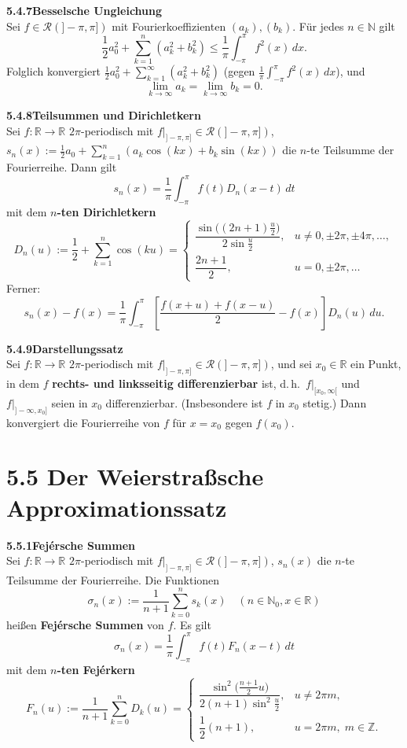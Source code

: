 \documentclass[a4paper,12pt]{article}
\newcommand{\gentry}[3]{%
  \noindent\textbf{#1\quad #2}\nopagebreak\\[0.2em]
  #3\par\smallskip
}
\begin{document}
\gentry{5.4.7}{Besselsche Ungleichung}{%
  Sei $f \in \mathcal{R}(]-\pi,\pi])$ mit Fourierkoeffizienten $(a_k), (b_k)$.
  Für jedes $n \in \mathbb{N}$ gilt
  \[
    \frac{1}{2} a_0^2 + \sum_{k=1}^n (a_k^2 + b_k^2)
    \leq \frac{1}{\pi} \int_{-\pi}^\pi f^2(x)\,dx.
  \]
  Folglich konvergiert $\frac{1}{2} a_0^2 + \sum_{k=1}^\infty (a_k^2 + b_k^2)$
  (gegen $\frac{1}{\pi}\int_{-\pi}^\pi f^2(x)\,dx$), und
  \[
    \lim_{k\to\infty} a_k = \lim_{k\to\infty} b_k = 0.
  \]
}

\gentry{5.4.8}{Teilsummen und Dirichletkern}{%
  Sei $f: \mathbb{R} \to \mathbb{R}$ $2\pi$-periodisch mit
  $f|_{]-\pi,\pi]} \in \mathcal{R}(]-\pi,\pi])$,
  $s_n(x) := \frac{1}{2} a_0 + \sum_{k=1}^n (a_k \cos(kx) + b_k \sin(kx))$ die
  $n$-te Teilsumme der Fourierreihe. Dann gilt
  \[
    s_n(x) = \frac{1}{\pi} \int_{-\pi}^\pi f(t) D_n(x - t)\,dt
  \]
  mit dem \textbf{$n$-ten Dirichletkern}
  \[
    D_n(u) := \frac{1}{2} + \sum_{k=1}^n \cos(ku) =
    \begin{cases}
      \dfrac{\sin\bigl((2n+1)\frac{u}{2}\bigr)}{2 \sin\frac{u}{2}}, & u \neq 0, \pm 2\pi, \pm 4\pi, \ldots,\\[0.5em]
      \dfrac{2n+1}{2}, & u = 0, \pm 2\pi, \ldots
    \end{cases}
  \]
  Ferner:
  \[
    s_n(x) - f(x) = \frac{1}{\pi} \int_{-\pi}^\pi \left[\frac{f(x+u) + f(x-u)}{2} - f(x)\right] D_n(u)\,du.
  \]
}

\gentry{5.4.9}{Darstellungssatz}{%
  Sei $f: \mathbb{R} \to \mathbb{R}$ $2\pi$-periodisch mit
  $f|_{]-\pi,\pi]} \in \mathcal{R}(]-\pi,\pi])$, und sei $x_0 \in \mathbb{R}$ ein
  Punkt, in dem $f$ \textbf{rechts- und linksseitig differenzierbar} ist, d.\,h.\
  $f|_{[x_0, \infty[}$ und $f|_{]-\infty, x_0]}$ seien in $x_0$ differenzierbar.
  (Insbesondere ist $f$ in $x_0$ stetig.) Dann konvergiert die Fourierreihe von
  $f$ für $x = x_0$ gegen $f(x_0)$.
}

\section*{5.5 \quad Der Weierstraßsche Approximationssatz}

\gentry{5.5.1}{Fejérsche Summen}{%
  Sei $f: \mathbb{R} \to \mathbb{R}$ $2\pi$-periodisch mit $f|_{]-\pi,\pi]} \in \mathcal{R}(]-\pi,\pi])$,
  $s_n(x)$ die $n$-te Teilsumme der Fourierreihe. Die Funktionen
  \[
    \sigma_n(x) := \frac{1}{n+1} \sum_{k=0}^n s_k(x) \quad (n \in \mathbb{N}_0, x \in \mathbb{R})
  \]
  heißen \textbf{Fejérsche Summen} von $f$. Es gilt
  \[
    \sigma_n(x) = \frac{1}{\pi} \int_{-\pi}^\pi f(t) F_n(x-t)\,dt
  \]
  mit dem \textbf{$n$-ten Fejérkern}
  \[
    F_n(u) := \frac{1}{n+1} \sum_{k=0}^n D_k(u) =
    \begin{cases}
      \dfrac{\sin^2\bigl(\frac{n+1}{2} u\bigr)}{2(n+1) \sin^2\frac{u}{2}}, & u \neq 2\pi m,\\[0.5em]
      \dfrac{1}{2}(n+1), & u = 2\pi m, \; m \in \mathbb{Z}.
    \end{cases}
  \]
}
\end{document}
